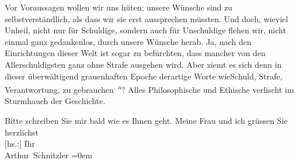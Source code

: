 \pstart
           Vor Voraussagen wollen wir uns hüten; unsere Wünsche sind zu selbstverständlich, als
               dass wir sie erst aussprechen müssten. Und doch, wieviel Unheil, nicht nur für
               Schuldige, sondern auch für Unschuldige flehen wir, nicht einmal ganz gedankenlos,
               durch unsere Wünsche herab. Ja, nach den Einrichtungen dieser Welt ist sogar zu
               befürchten, dass mancher von den Allerschuldigsten ganz ohne Strafe ausgehen wird.
               Aber ziemt es sich \introOben{}denn\introOben{} in dieser überwältigend grauenhaften
               Epoche derartige Worte \introOben{}wie\introOben{}{ }Schuld, Strafe, Verantwortung, zu gebrauchen\substVorne{}\textsuperscript{, a}\substDazwischen{}? A\substHinten{}lles Philosophische und Ethische verlischt im Sturmhauch der Geschichte.\pend
           
\pstart
           Bitte schreiben Sie mir bald wie es Ihnen geht. Meine Frau und ich grüssen Sie herzlichst{\\[\baselineskip]}{[}hs.:{]} Ihr{\\[\baselineskip]}\spacefill\mbox{Arthur Schnitzler}\pend
           \leftskip=0em{}\endnumbering{}  \newcommand{\dateiname}{L02199}\newcommand{\titel}{Arthur Schnitzler an Georg Brandes, 20. 10. 1914}\newcommand{\editorInnen}{Martin Anton Müller und Gerd-Hermann Susen}
